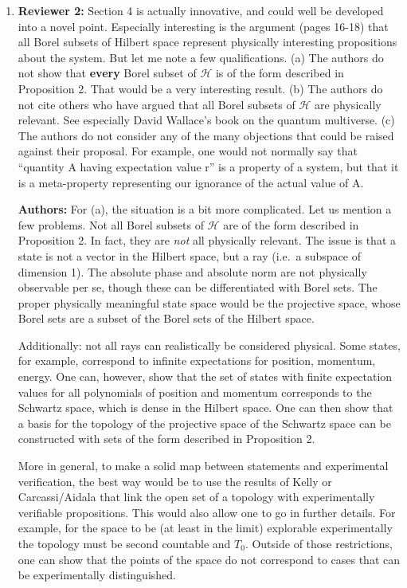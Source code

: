 \documentclass[11pt, executivepaper]{article}
\begin{document}
\begin{enumerate}
\item \textbf{Reviewer 2:} Section 4 is actually innovative, and could well be developed into a novel point. Especially interesting is the argument (pages 16-18) that all Borel subsets of Hilbert space represent physically interesting propositions about the system. But let me note a few qualifications. (a) The authors do not show that \textbf{every} Borel subset of $\mathcal{H}$ is of the form described in Proposition 2. That would be a very interesting result. (b) The authors do not cite others who have argued that all Borel subsets of $\mathcal{H}$ are physically relevant. See especially David Wallace's book on the quantum multiverse. (c) The authors do not consider any of the many objections that could be raised against their proposal. For example, one would not normally say that ``quantity A having expectation value r'' is a property of a system, but that it is a meta-property representing our ignorance of the actual value of A.
\vspace{2mm}

\textbf{Authors:} For (a), the situation is a bit more complicated. Let us mention a few problems. Not all Borel subsets of $\mathcal{H}$ are of the form described in Proposition 2. In fact, they are \emph{not} all physically relevant. The issue is that a state is not a vector in the Hilbert space, but a ray (i.e.\ a subspace of dimension 1). The absolute phase and absolute norm are not physically observable per se, though these can be differentiated with Borel sets. The proper physically meaningful state space would be the projective space, whose Borel sets are a subset of the Borel sets of the Hilbert space.

Additionally: not all rays can realistically be considered physical. Some states, for example, correspond to infinite expectations for position, momentum, energy. One can, however, show that the set of states with finite expectation values for all polynomials of position and momentum corresponds to the Schwartz space, which is dense in the Hilbert space. One can then show that a basis for the topology of the projective space of the Schwartz space can be constructed with sets of the form described in Proposition 2.

More in general, to make a solid map between statements and experimental verification, the best way would be to use the results of Kelly or Carcassi/Aidala that link the open set of a topology with experimentally verifiable propositions. This would also allow one to go in further details. For example, for the space to be (at least in the limit) explorable experimentally the topology must be second countable and $T_0$. Outside of those restrictions, one can show that the points of the space do not correspond to cases that can be experimentally distinguished.


\end{enumerate}
\end{document}
